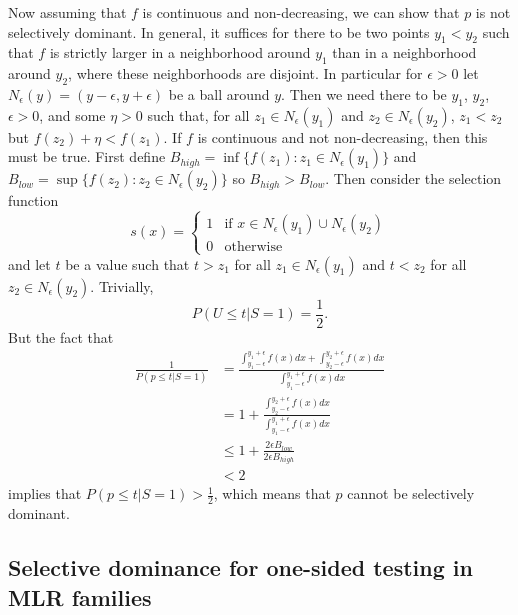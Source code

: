 \documentclass{article}
\begin{document}
\begin{appendix}
Now assuming that $f$ is continuous and non-decreasing, we can show that $p$ is not selectively dominant. In general, it suffices for there to be two points $y_1 < y_2$ such that $f$ is strictly larger in a neighborhood around $y_1$ than in a neighborhood around $y_2$, where these neighborhoods are disjoint. In particular for $\epsilon > 0$ let $N_{\epsilon}(y) = (y - \epsilon, y + \epsilon )$ be a ball around $y$. Then we need there to be $y_1$, $y_2$, $\epsilon > 0$, and some $\eta > 0$ such that, for all $z_1 \in N_{\epsilon}(y_1)$ and $z_2 \in N_{\epsilon}(y_2)$,  $z_1  < z_2$ but $f(z_2) + \eta < f(z_1) $. If $f$ is continuous and not non-decreasing, then this must be true. First define $B_{high} = \inf \{f(z_1): z_1 \in N_{\epsilon}(y_1)\}$ and  $B_{low} = \sup \{f(z_2): z_2 \in N_{\epsilon}(y_2)\}$ so $B_{high}  > B_{low}$. Then consider the selection function 
\begin{equation*}
s(x)= \begin{cases}
1 &\text{if } x \in N_{\epsilon}(y_1) \cup N_{\epsilon}(y_2) \\
0 &\text{otherwise }
\end{cases}
\end{equation*}
and let $t$ be a value such that $t > z_1$ for all $z_1 \in N_{\epsilon}(y_1)$ and $t < z_2$ for all $z_2 \in  N_{\epsilon}(y_2)$. Trivially, 
\begin{equation*}
    P(U \leq t | S = 1) = \frac{1}{2}. 
\end{equation*}
But the fact that 
\begin{align*}
    \frac{1}{P(p \leq t | S = 1)} &= \frac{ \int_{y_1 - \epsilon}^{y_1 + \epsilon} f(x) dx + \int_{y_2 - \epsilon}^{y_2 + \epsilon} f(x) dx  }{\int_{y_1 - \epsilon}^{y_1 + \epsilon} f(x) dx}\\
    &= 1 + \frac{ \int_{y_2 - \epsilon}^{y_2 + \epsilon} f(x) dx  }{\int_{y_1 - \epsilon}^{y_1 + \epsilon} f(x) dx}\\
    &\leq 1 + \frac{ 2\epsilon B_{low}  }{2\epsilon B_{high} }\\
    & < 2
\end{align*}
implies that $P(p \leq t | S = 1) > \frac{1}{2} $, which means that $p$ cannot be selectively dominant. 

\iffalse 
\subsection{Selective dominance for one-sided testing in MLR families}
\label{sec:mlr_selective_dominance_appdx}


\end{appendix}
\end{document}
